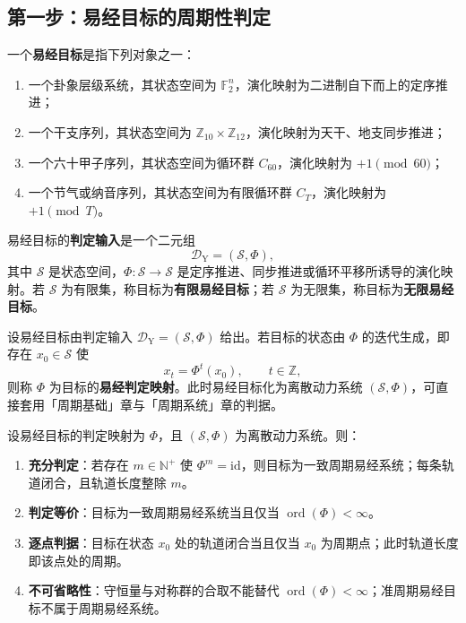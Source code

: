 \subsection{第一步：易经目标的周期性判定}

\begin{definition}[易经目标与判定输入]\label{def:yijing_target}
一个\textbf{易经目标}是指下列对象之一：
\begin{enumerate}[label=(\roman*)]
    \item 一个卦象层级系统，其状态空间为 $\mathbb F_2^n$，演化映射为二进制自下而上的定序推进；
    \item 一个干支序列，其状态空间为 $\mathbb Z_{10}\times \mathbb Z_{12}$，演化映射为天干、地支同步推进；
    \item 一个六十甲子序列，其状态空间为循环群 $C_{60}$，演化映射为 $+1\pmod{60}$；
    \item 一个节气或纳音序列，其状态空间为有限循环群 $C_T$，演化映射为 $+1\pmod T$。
\end{enumerate}
易经目标的\textbf{判定输入}是一个二元组
\[
\mathcal D_{\mathrm{Y}}=(\mathcal S,\Phi),
\]
其中 $\mathcal S$ 是状态空间，$\Phi:\mathcal S\to\mathcal S$ 是定序推进、同步推进或循环平移所诱导的演化映射。若 $\mathcal S$ 为有限集，称目标为\textbf{有限易经目标}；若 $\mathcal S$ 为无限集，称目标为\textbf{无限易经目标}。
\end{definition}

\begin{definition}[易经判定映射]\label{def:yijing_periodization}
设易经目标由判定输入 $\mathcal D_{\mathrm{Y}}=(\mathcal S,\Phi)$ 给出。若目标的状态由 $\Phi$ 的迭代生成，即存在 $x_0\in\mathcal S$ 使
\[
x_t=\Phi^t(x_0),\qquad t\in\mathbb Z,
\]
则称 $\Phi$ 为目标的\textbf{易经判定映射}。此时易经目标化为离散动力系统 $(\mathcal S,\Phi)$，可直接套用「周期基础」章与「周期系统」章的判据。
\end{definition}

\begin{theorem}[易经周期性判定定理]\label{thm:yijing_periodicity_decision}
设易经目标的判定映射为 $\Phi$，且 $(\mathcal S,\Phi)$ 为离散动力系统。则：
\begin{enumerate}[label=(\Alph*)]
    \item \textbf{充分判定}：若存在 $m\in\mathbb N^+$ 使 $\Phi^m=\mathrm{id}$，则目标为一致周期易经系统；每条轨道闭合，且轨道长度整除 $m$。
    \item \textbf{判定等价}：目标为一致周期易经系统当且仅当 $\operatorname{ord}(\Phi)<\infty$。
    \item \textbf{逐点判据}：目标在状态 $x_0$ 处的轨道闭合当且仅当 $x_0$ 为周期点；此时轨道长度即该点处的周期。
    \item \textbf{不可省略性}：守恒量与对称群的合取不能替代 $\operatorname{ord}(\Phi)<\infty$；准周期易经目标不属于周期易经系统。
\end{enumerate}
\end{theorem}

